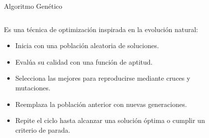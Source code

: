 \documentclass[handout]{beamer}
\begin{document}
\begin{frame}{Algoritmo Genético}
    \begin{columns}
        \begin{column}{0.7\textwidth}
            \begin{exampleblock}{Es una técnica de optimización inspirada en la evolución natural:}
                \begin{itemize}[<+-| alert@+>]
                    \item Inicia con una población aleatoria de soluciones.
                    \item Evalúa su calidad con una función de aptitud.
                    \item Selecciona las mejores para reproducirse mediante cruces y mutaciones.
                    \item Reemplaza la población anterior con nuevas generaciones.
                    \item Repite el ciclo hasta alcanzar una solución óptima o cumplir un criterio de parada.
                \end{itemize}
            \end{exampleblock}
        \end{column}
        \begin{column}{0.4\textwidth}
            \begin{figure}
                \centering

\end{figure}
\end{column}
\end{columns}
\end{frame}
\end{document}

